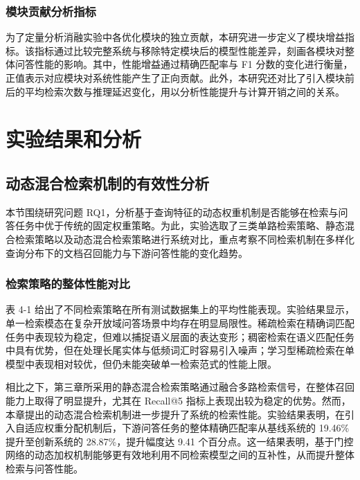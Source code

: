 \subsubsection{模块贡献分析指标}

为了定量分析消融实验中各优化模块的独立贡献，本研究进一步定义了模块增益指标。该指标通过比较完整系统与移除特定模块后的模型性能差异，刻画各模块对整体问答性能的影响。其中，性能增益通过精确匹配率与 F1 分数的变化进行衡量，正值表示对应模块对系统性能产生了正向贡献。此外，本研究还对比了引入模块前后的平均检索次数与推理延迟变化，用以分析性能提升与计算开销之间的关系。

\section{实验结果和分析}
\subsection{动态混合检索机制的有效性分析}

本节围绕研究问题 RQ1，分析基于查询特征的动态权重机制是否能够在检索与问答任务中优于传统的固定权重策略。为此，实验选取了三类单路检索策略、静态混合检索策略以及动态混合检索策略进行系统对比，重点考察不同检索机制在多样化查询分布下的文档召回能力与下游问答性能的变化趋势。

\subsubsection{检索策略的整体性能对比}

表 4-1 给出了不同检索策略在所有测试数据集上的平均性能表现。实验结果显示，单一检索模态在复杂开放域问答场景中均存在明显局限性。稀疏检索在精确词匹配任务中表现较为稳定，但难以捕捉语义层面的表达变形；稠密检索在语义匹配任务中具有优势，但在处理长尾实体与低频词汇时容易引入噪声；学习型稀疏检索在单模型中表现相对较优，但仍未能突破单一检索范式的性能上限。

相比之下，第三章所采用的静态混合检索策略通过融合多路检索信号，在整体召回能力上取得了明显提升，尤其在 Recall@5 指标上表现出较为稳定的优势。然而，本章提出的动态混合检索机制进一步提升了系统的检索性能。实验结果表明，在引入自适应权重分配机制后，下游问答任务的整体精确匹配率从基线系统的 19.46\% 提升至创新系统的 28.87\%，提升幅度达 9.41 个百分点。这一结果表明，基于门控网络的动态加权机制能够更有效地利用不同检索模型之间的互补性，从而提升整体检索与问答性能。


